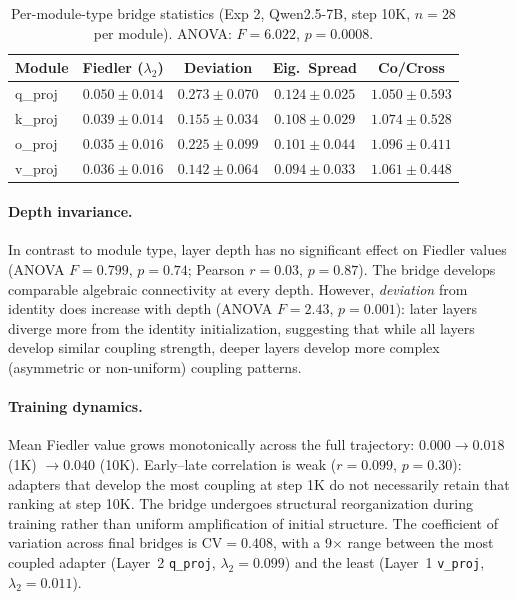 \begin{table}[t]
\centering
\caption{Per-module-type bridge statistics (Exp 2, Qwen2.5-7B, step 10K,
$n = 28$ per module). ANOVA: $F = 6.022$, $p = 0.0008$.}
\label{tab:module-anatomy}
\small
\begin{tabular}{@{}lcccc@{}}
\toprule
Module & Fiedler ($\lambda_2$) & Deviation & Eig.\ Spread & Co/Cross \\
\midrule
q\_proj & $0.050 \pm 0.014$ & $0.273 \pm 0.070$ & $0.124 \pm 0.025$ & $1.050 \pm 0.593$ \\
k\_proj & $0.039 \pm 0.014$ & $0.155 \pm 0.034$ & $0.108 \pm 0.029$ & $1.074 \pm 0.528$ \\
o\_proj & $0.035 \pm 0.016$ & $0.225 \pm 0.099$ & $0.101 \pm 0.044$ & $1.096 \pm 0.411$ \\
v\_proj & $0.036 \pm 0.016$ & $0.142 \pm 0.064$ & $0.094 \pm 0.033$ & $1.061 \pm 0.448$ \\
\bottomrule
\end{tabular}
\end{table}

\paragraph{Depth invariance.}
In contrast to module type, layer depth has no significant effect on Fiedler
values (ANOVA $F = 0.799$, $p = 0.74$; Pearson $r = 0.03$, $p = 0.87$).
The bridge develops comparable algebraic connectivity at every depth. However,
\emph{deviation} from identity does increase with depth (ANOVA $F = 2.43$,
$p = 0.001$): later layers diverge more from the identity initialization,
suggesting that while all layers develop similar coupling strength, deeper
layers develop more complex (asymmetric or non-uniform) coupling patterns.

\paragraph{Training dynamics.}
Mean Fiedler value grows monotonically across the full trajectory: $0.000
\to 0.018$ (1K) $\to 0.040$ (10K). Early--late correlation is weak
($r = 0.099$, $p = 0.30$): adapters that develop the most coupling at step
1K do not necessarily retain that ranking at step 10K. The bridge undergoes
structural reorganization during training rather than uniform amplification
of initial structure. The coefficient of variation across final bridges is
$\text{CV} = 0.408$, with a 9$\times$ range between the most coupled adapter
(Layer~2 \texttt{q\_proj}, $\lambda_2 = 0.099$) and the least (Layer~1
\texttt{v\_proj}, $\lambda_2 = 0.011$).

